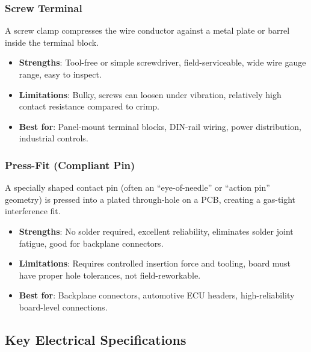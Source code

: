 \subsubsection{Screw Terminal}

A screw clamp compresses the wire conductor against a metal plate or barrel inside the terminal block.

\begin{itemize}[nosep,leftmargin=1.5em]
  \item \textbf{Strengths}: Tool-free or simple screwdriver, field-serviceable, wide wire gauge range, easy to inspect.
  \item \textbf{Limitations}: Bulky, screws can loosen under vibration, relatively high contact resistance compared to crimp.
  \item \textbf{Best for}: Panel-mount terminal blocks, DIN-rail wiring, power distribution, industrial controls.
\end{itemize}

\subsubsection{Press-Fit (Compliant Pin)}

A specially shaped contact pin (often an ``eye-of-needle'' or ``action pin'' geometry) is pressed into a plated through-hole on a PCB, creating a gas-tight interference fit.

\begin{itemize}[nosep,leftmargin=1.5em]
  \item \textbf{Strengths}: No solder required, excellent reliability, eliminates solder joint fatigue, good for backplane connectors.
  \item \textbf{Limitations}: Requires controlled insertion force and tooling, board must have proper hole tolerances, not field-reworkable.
  \item \textbf{Best for}: Backplane connectors, automotive ECU headers, high-reliability board-level connections.
\end{itemize}

\begin{tipbox}

\end{tipbox}




\subsection{Key Electrical Specifications}
\label{sec:elecspecs}

